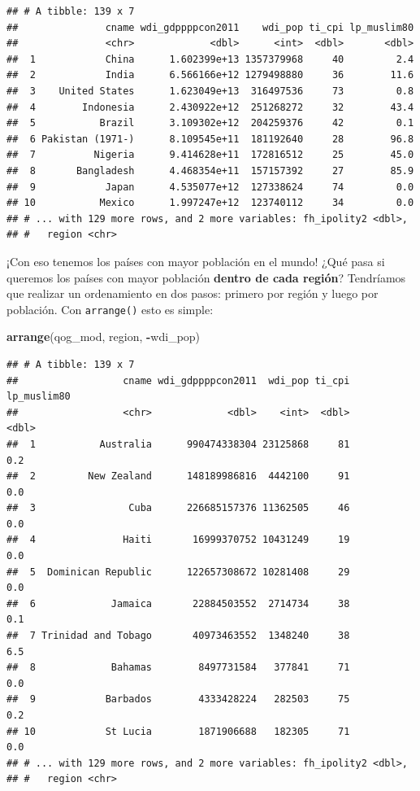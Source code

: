 \documentclass[]{book}
\newenvironment{Shaded}{\begin{snugshade}}{\end{snugshade}}
\newcommand{\KeywordTok}[1]{\textcolor[rgb]{0.13,0.29,0.53}{\textbf{#1}}}
\newcommand{\OperatorTok}[1]{\textcolor[rgb]{0.81,0.36,0.00}{\textbf{#1}}}
\newcommand{\NormalTok}[1]{#1}
\begin{document}
\begin{verbatim}
## # A tibble: 139 x 7
##               cname wdi_gdppppcon2011    wdi_pop ti_cpi lp_muslim80
##               <chr>             <dbl>      <int>  <dbl>       <dbl>
##  1            China      1.602399e+13 1357379968     40         2.4
##  2            India      6.566166e+12 1279498880     36        11.6
##  3    United States      1.623049e+13  316497536     73         0.8
##  4        Indonesia      2.430922e+12  251268272     32        43.4
##  5           Brazil      3.109302e+12  204259376     42         0.1
##  6 Pakistan (1971-)      8.109545e+11  181192640     28        96.8
##  7          Nigeria      9.414628e+11  172816512     25        45.0
##  8       Bangladesh      4.468354e+11  157157392     27        85.9
##  9            Japan      4.535077e+12  127338624     74         0.0
## 10           Mexico      1.997247e+12  123740112     34         0.0
## # ... with 129 more rows, and 2 more variables: fh_ipolity2 <dbl>,
## #   region <chr>
\end{verbatim}

¡Con eso tenemos los países con mayor población en el mundo! ¿Qué pasa
si queremos los países con mayor población \textbf{dentro de cada
región}? Tendríamos que realizar un ordenamiento en dos pasos: primero
por región y luego por población. Con \texttt{arrange()} esto es simple:

\begin{Shaded}
\begin{Highlighting}[]
\KeywordTok{arrange}\NormalTok{(qog_mod, region, }\OperatorTok{-}\NormalTok{wdi_pop)}
\end{Highlighting}
\end{Shaded}

\begin{verbatim}
## # A tibble: 139 x 7
##                  cname wdi_gdppppcon2011  wdi_pop ti_cpi lp_muslim80
##                  <chr>             <dbl>    <int>  <dbl>       <dbl>
##  1           Australia      990474338304 23125868     81         0.2
##  2         New Zealand      148189986816  4442100     91         0.0
##  3                Cuba      226685157376 11362505     46         0.0
##  4               Haiti       16999370752 10431249     19         0.0
##  5  Dominican Republic      122657308672 10281408     29         0.0
##  6             Jamaica       22884503552  2714734     38         0.1
##  7 Trinidad and Tobago       40973463552  1348240     38         6.5
##  8             Bahamas        8497731584   377841     71         0.0
##  9            Barbados        4333428224   282503     75         0.2
## 10            St Lucia        1871906688   182305     71         0.0
## # ... with 129 more rows, and 2 more variables: fh_ipolity2 <dbl>,
## #   region <chr>
\end{verbatim}
\end{document}
